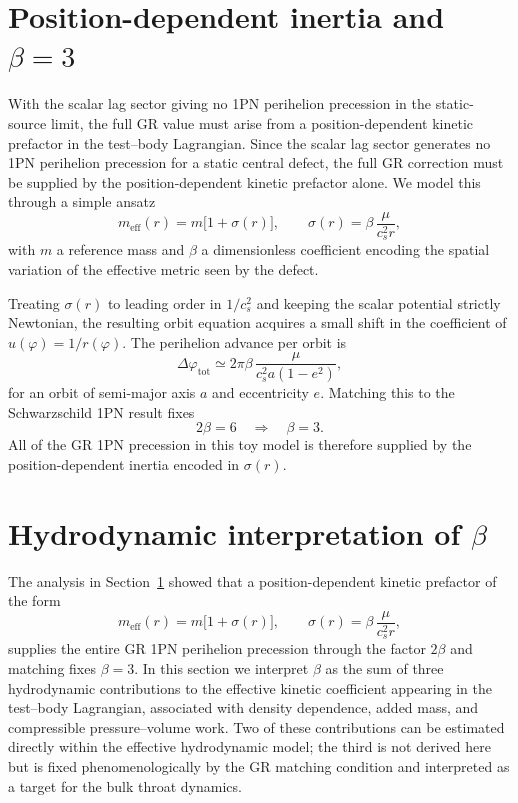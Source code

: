 \documentclass[11pt]{article}
\newcommand{\cS}{c_s}
\begin{document}
\section{Position-dependent inertia and \texorpdfstring{$\beta = 3$}{beta = 3}}
\label{sec:beta}

With the scalar lag sector giving no 1PN perihelion precession in the static-source limit, the full GR value must arise from a position-dependent kinetic prefactor in the test--body Lagrangian. Since the scalar lag sector generates no 1PN perihelion precession for a static central defect, the full GR correction must be supplied by the position-dependent kinetic prefactor alone. We model this through a simple ansatz
\begin{equation}
  m_{\mathrm{eff}}(r) = m\bigl[1 + \sigma(r)\bigr],
  \qquad
  \sigma(r) = \beta\,\frac{\mu}{\cS^2 r},
  \label{eq:sigma_ansatz}
\end{equation}
with $m$ a reference mass and $\beta$ a dimensionless coefficient encoding the spatial variation of the effective metric seen by the defect.

Treating $\sigma(r)$ to leading order in $1/\cS^2$ and keeping the scalar potential strictly Newtonian, the resulting orbit equation acquires a small shift in the coefficient of $u(\varphi) = 1/r(\varphi)$. The perihelion advance per orbit is
\begin{equation}
  \Delta \varphi_{\mathrm{tot}}
  \simeq 2\pi\beta\,
         \frac{\mu}{\cS^2 a (1-e^2)},
  \label{eq:Delta_phi_total_beta}
\end{equation}
for an orbit of semi-major axis $a$ and eccentricity $e$. Matching this to the Schwarzschild 1PN result fixes
\begin{equation}
  2\beta = 6
  \quad\Rightarrow\quad
  \beta = 3.
\end{equation}
All of the GR 1PN precession in this toy model is therefore supplied by the position-dependent inertia encoded in $\sigma(r)$.


\section{Hydrodynamic interpretation of \texorpdfstring{$\beta$}{beta}}
\label{sec:hydro_beta}

The analysis in Section~\ref{sec:beta} showed that a position-dependent kinetic prefactor of the form
\begin{equation}
  m_{\mathrm{eff}}(r)
  = m\bigl[1 + \sigma(r)\bigr],
  \qquad
  \sigma(r) = \beta\,\frac{\mu}{\cS^2 r},
\end{equation}
supplies the entire GR 1PN perihelion precession through the factor $2\beta$ and matching fixes $\beta = 3$. In this section we interpret $\beta$ as the sum of three hydrodynamic contributions to the effective kinetic coefficient appearing in the test--body Lagrangian, associated with density dependence, added mass, and compressible pressure--volume work. Two of these contributions can be estimated directly within the effective hydrodynamic model; the third is not derived here but is fixed phenomenologically by the GR matching condition and interpreted as a target for the bulk throat dynamics.
\end{document}
